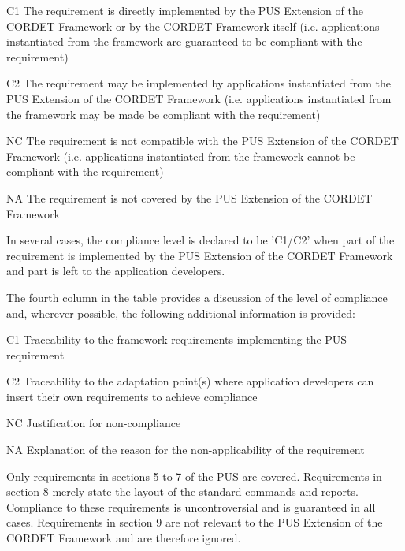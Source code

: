 \documentclass{pnp_article}
\begin{document}
\begin{fw_itemize}
\item [C1] The requirement is directly implemented by the PUS Extension of the CORDET Framework or by the CORDET Framework itself (i.e. applications instantiated from the framework are guaranteed to be compliant with the requirement)
\item [C2] The requirement may be implemented by applications instantiated from the PUS Extension of the CORDET Framework (i.e. applications instantiated from the framework may be made be compliant with the requirement)
\item [NC] The requirement is not compatible with the PUS Extension of the CORDET Framework (i.e. applications instantiated from the framework cannot be compliant with the requirement)
\item [NA] The requirement is not covered by the PUS Extension of the CORDET Framework
\end{fw_itemize}

In several cases, the compliance level is declared to be 'C1/C2' when part of the requirement is implemented by the PUS Extension of the CORDET Framework and part is left to the application developers.

The fourth column in the table provides a discussion of the level of compliance and, wherever possible, the following additional information is provided:

\begin{fw_itemize}
\item [C1] Traceability to the framework requirements implementing the PUS requirement 
\item [C2] Traceability to the adaptation point(s) where application developers can insert their own requirements to achieve compliance
\item [NC] Justification for non-compliance
\item [NA] Explanation of the reason for the non-applicability of the requirement
\end{fw_itemize}

Only requirements in sections 5 to 7 of the PUS are covered. Requirements in section 8 merely state the layout of the standard commands and reports. Compliance to these requirements is uncontroversial and is guaranteed in all cases. Requirements in section 9 are not relevant to the PUS Extension of the CORDET Framework and are therefore ignored.
\end{document}
